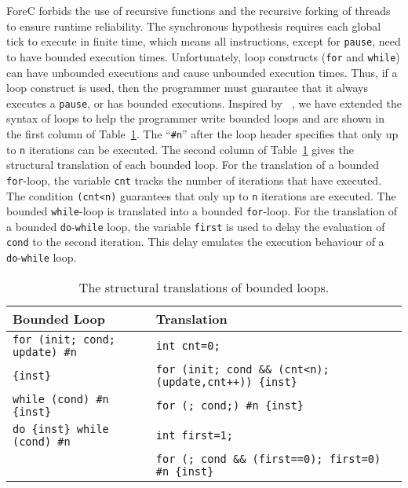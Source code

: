 ForeC forbids the use of recursive functions and the recursive 
forking of threads to ensure runtime reliability. 
The synchronous hypothesis requires each global tick to execute 
in finite time, which means all instructions, except for \verb$pause$, 
need to have bounded execution times. Unfortunately, loop constructs 
(\verb$for$ and \verb$while$) can have unbounded executions and 
cause unbounded execution times. Thus, if a loop construct is used, 
then the programmer must guarantee that it always executes 
a \verb$pause$, or has bounded executions. Inspired by \pretc{}~\cite{pret_pretc}, 
we have extended the syntax of loops to help the programmer write 
bounded loops and are shown in the first column of Table~\ref{table:forec_loop_translations}. 
The ``\verb$#n$'' after the loop header specifies 
that only up to \verb$n$ iterations can be executed.
The second column of Table~\ref{table:forec_loop_translations}
gives the structural translation of each bounded loop. 
For the translation of a bounded \verb$for$-loop,
the variable \verb$cnt$ tracks the number of iterations that have 
executed. The condition \verb$(cnt<n)$ guarantees that 
only up to \verb$n$ iterations are executed. The bounded 
\verb$while$-loop is translated into a bounded \verb$for$-loop. 
For the translation of a bounded \verb$do$-\verb$while$ loop, 
the variable \verb$first$ is used to delay the evaluation of 
\verb$cond$ to the second iteration. This delay emulates the 
execution behaviour of a \verb$do$-\verb$while$ loop. 

\begin{table}
	\centering
	\renewcommand{\arraystretch}{1.25}
	
	\begin{tabular}{| l | l |}
		\hline
		\bf{Bounded Loop}							& \bf{Translation}											\\ \hline
		\verb$for (init; cond; update) #n$			& \verb$int cnt=0;$											\\
		\verb${inst}$								& \verb$for (init; cond && (cnt<n); (update,cnt++)) {inst}$	\\ \hline
		\verb$while (cond) #n {inst}$				& \verb$for (; cond;) #n {inst}$							\\ \hline
		\verb$do {inst} while (cond) #n$			& \verb$int first=1;$										\\
													& \verb$for (; cond && (first==0); first=0) #n {inst}$		\\ \hline
	\end{tabular}
	
	\caption{The structural translations of bounded loops.}
	\label{table:forec_loop_translations}
\end{table}
